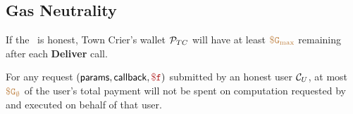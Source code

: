 \subsection{Gas Neutrality}


\begin{theorem}
If the \tc~\medname is honest,
Town Crier's wallet ${\cal P}_{TC}$ will have at least $\tt {\color{brown} \$G_\text{max} }$ remaining after each {\bf Deliver} call.
\end{theorem}


\begin{theorem}
For any request $(\dgform, \dgcallback, \fee)$ submitted by an honest user ${\cal C}_U$,
at most $\tt {\color{brown} \$G_\emptyset }$ of the user's total payment will not be spent on computation requested by and executed on behalf of that user.
\end{theorem}




